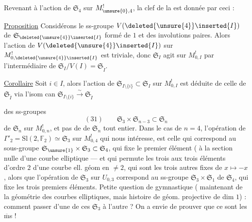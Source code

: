 Revenant à l'action de $\mathfrak{S}_4$ sur
$M_{\unsure{0},4}^{!}$, la clef de la 
est donnée par ceci :

\uline{Proposition} Considérons le ss-groupe
$V(\deleted{\unsure{4}}\inserted{I})$ de $\mathfrak{S}_{\deleted{\unsure{4}}\inserted{I}}$ formé de $1$ et des involutions
paires. Alors l'action de $V(\deleted{\unsure{4}}\inserted{I})$ sur $M_{0,\deleted{\unsure{4}}\inserted{I}}^{!}$
est triviale,  donc  $\mathfrak{S}_I$ agit
sur $M_{0,I}^{!}$ par l'intermédiaire de
$\mathfrak{S}_I/V(I)=\mathfrak{S}_{\widetilde I}$.


\uline{Corollaire} Soit $i\in I$, alors l'action
de $\mathfrak{S}_{I\setminus\{i\}}\subset\mathfrak{S}_I$ sur $M_{0,I}^{!}$ est déduite
de celle de $\mathfrak{S}_{\widetilde I}$ via l'isom can $\mathfrak{S}_{I\setminus\{i\}}\xrightarrow{\sim}\mathfrak{S}_{\widetilde I}$

 des ss-groupes
\[
 (31)\qquad \mathfrak{S}_3\times\mathfrak{S}_{n-3}\subset\mathfrak{S}_n
\]
de $\mathfrak{S}_n$ sur $M_{0,n}^{!}$, et pas de  de
$\mathfrak{S}_n$ tout entier. Dans le cas de $n=4$,
l'opération de $\Gamma'_2=\mathrm{Sl}(2,\mathbb{F}_2)\simeq\mathfrak{S}_3$ sur
$M_{0,4}^{!}$ qui nous intéresse, est celle qui
correspond au sous-groupe $\mathfrak{S}_{\unsure{1}}\times\mathfrak{S}_3\subset\mathfrak{S}_4$,
qui fixe le premier élément ( à
la section nulle d'une courbe elliptique
---  et qui permute les trois 
 aux trois éléments d'ordre $2$
d'une courbe ell. géom en  $\ne 2$, qui
sont les trois autres  fixes de
$x\mapsto -x$, alors que l'opération  de
$\mathfrak{S}_3$ sur $U_{0,3}$ correspond au ss-groupe
$\mathfrak{S}_3\times\mathfrak{S}_1$ de $\mathfrak{S}_4$, qui fixe les trois premiers
éléments. Petite question de gymnastique
 ( maintenant de la
géométrie des courbes elliptiques, mais
histoire de géom. projective de dim $1$) :
comment passer d'une de ces 
$\mathfrak{S}_3$ à l'autre ? On a envie de prouver que
ce sont les $\overline{\mathrm m}$s !

